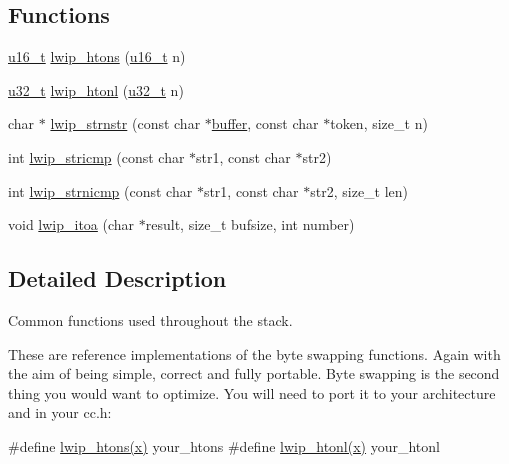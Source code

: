 \subsection*{Functions}
\begin{DoxyCompactItemize}
\item 
\hyperlink{group__compiler__abstraction_ga77570ac4fcab86864fa1916e55676da2}{u16\+\_\+t} \hyperlink{openmote-cc2538_2lwip_2src_2core_2def_8c_ad637280639de4066392e6b5614fa3e56}{lwip\+\_\+htons} (\hyperlink{group__compiler__abstraction_ga77570ac4fcab86864fa1916e55676da2}{u16\+\_\+t} n)
\item 
\hyperlink{group__compiler__abstraction_ga4c14294869aceba3ef9d4c0c302d0f33}{u32\+\_\+t} \hyperlink{openmote-cc2538_2lwip_2src_2core_2def_8c_a14f94347a5b9b9e3602705b75b7ae524}{lwip\+\_\+htonl} (\hyperlink{group__compiler__abstraction_ga4c14294869aceba3ef9d4c0c302d0f33}{u32\+\_\+t} n)
\item 
char $\ast$ \hyperlink{group__sys__nonstandard_gaa2ba4b4e2dd7e1c856fedc6a6069813e}{lwip\+\_\+strnstr} (const char $\ast$\hyperlink{driver__sdcard__spi_2main_8c_a1870d2717147e1356f2eb4e5d5fa4a1c}{buffer}, const char $\ast$token, size\+\_\+t n)
\item 
int \hyperlink{group__sys__nonstandard_ga263cbafcb697eff964139a9998a6668a}{lwip\+\_\+stricmp} (const char $\ast$str1, const char $\ast$str2)
\item 
int \hyperlink{group__sys__nonstandard_ga997dcc49451121d4ed755b33bc7bd26a}{lwip\+\_\+strnicmp} (const char $\ast$str1, const char $\ast$str2, size\+\_\+t len)
\item 
void \hyperlink{group__sys__nonstandard_gaf15b4fbaaae5bb7f6da4301f3f979284}{lwip\+\_\+itoa} (char $\ast$result, size\+\_\+t bufsize, int number)
\end{DoxyCompactItemize}


\subsection{Detailed Description}
Common functions used throughout the stack.

These are reference implementations of the byte swapping functions. Again with the aim of being simple, correct and fully portable. Byte swapping is the second thing you would want to optimize. You will need to port it to your architecture and in your cc.\+h\+:

\#define \hyperlink{openmote-cc2538_2lwip_2src_2include_2lwip_2def_8h_a3cdda64857295e6661fb7962f66adfb9}{lwip\+\_\+htons(x)} your\+\_\+htons \#define \hyperlink{openmote-cc2538_2lwip_2src_2include_2lwip_2def_8h_a9c0cf5ec6af0664ca8cea5bcf6319a56}{lwip\+\_\+htonl(x)} your\+\_\+htonl

